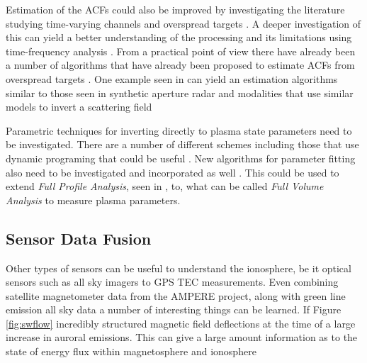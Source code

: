 Estimation of the ACFs could also be improved by investigating the literature studying time-varying channels and overspread targets \cite{Kailath:1962jx,Kailath:1963gh,Pfander:2006hh,Pfander:2015ea}. A deeper investigation of this can yield a better understanding of the processing and its limitations using time-frequency analysis \cite{TFAcohen,Peyrin:1986bh,Jiang:kj}. From a practical point of view there have already been a number of algorithms that have already been proposed to estimate ACFs from overspread targets \cite{Pfander:2015ea,Jiang:kj}. One example seen in \cite{Kay:2003jl} can yield an estimation algorithms similar to those seen in synthetic aperture radar and modalities that use similar models to invert a scattering field \cite{1456966,Ralston:2007hs,richards2014fundamentals}

Parametric techniques for inverting directly to plasma state parameters need to be investigated. There are a number of different schemes including those that use dynamic programing that could be useful \cite{Yau:1992kd,Yau:1993kf,Oktem:2014ju}. New algorithms for parameter fitting also need to be investigated and incorporated as well \cite{Shpynev:2010co}. This could be used to extend \textit{Full Profile Analysis}, seen in \cite{RDS:RDS3308,hysell2008}, to, what can be called \textit{Full Volume Analysis} to measure plasma parameters.

\subsection{Sensor Data Fusion}

Other types of sensors can be useful to understand the ionosphere, be it optical sensors such as all sky imagers to GPS TEC measurements. Even combining satellite magnetometer data from the AMPERE project\cite{Anderson:2000uh,Anderson:2014hf}, along with green line emission all sky data a number of interesting things can be learned. If Figure \ref{fig:swflow} incredibly structured magnetic field deflections at the time of a large increase in auroral emissions. This can give a large amount  information as to the state of energy flux within magnetosphere and ionosphere

